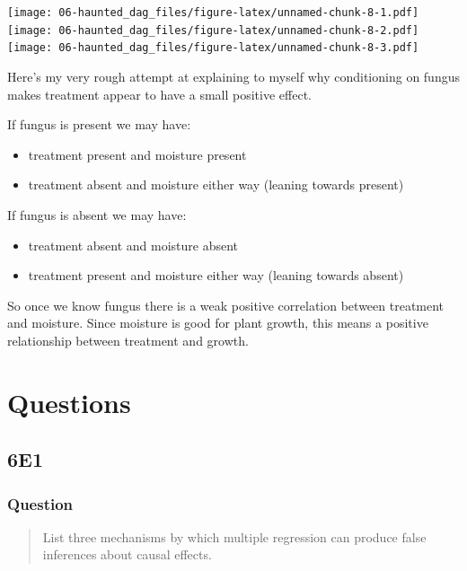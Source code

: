 \documentclass[
]{book}
\providecommand{\tightlist}{%
  \setlength{\itemsep}{0pt}\setlength{\parskip}{0pt}}
\begin{document}
\texttt{[image: 06-haunted\_dag\_files/figure-latex/unnamed-chunk-8-1.pdf]} \texttt{[image: 06-haunted\_dag\_files/figure-latex/unnamed-chunk-8-2.pdf]} \texttt{[image: 06-haunted\_dag\_files/figure-latex/unnamed-chunk-8-3.pdf]}

Here's my very rough attempt at explaining to myself why conditioning on fungus makes treatment appear to have a small positive effect.

If fungus is present we may have:

\begin{itemize}
\tightlist
\item
  treatment present and moisture present
\item
  treatment absent and moisture either way (leaning towards present)
\end{itemize}

If fungus is absent we may have:

\begin{itemize}
\tightlist
\item
  treatment absent and moisture absent
\item
  treatment present and moisture either way (leaning towards absent)
\end{itemize}

So once we know fungus there is a weak positive correlation between treatment and moisture. Since moisture is good for plant growth, this means a positive relationship between treatment and growth.

\hypertarget{questions-5}{%
\section{Questions}\label{questions-5}}

\hypertarget{e1-4}{%
\subsection*{6E1}\label{e1-4}}

\hypertarget{question-49}{%
\subsubsection*{Question}\label{question-49}}

\begin{quote}
List three mechanisms by which multiple regression can produce false inferences about causal effects.
\end{quote}
\end{document}
